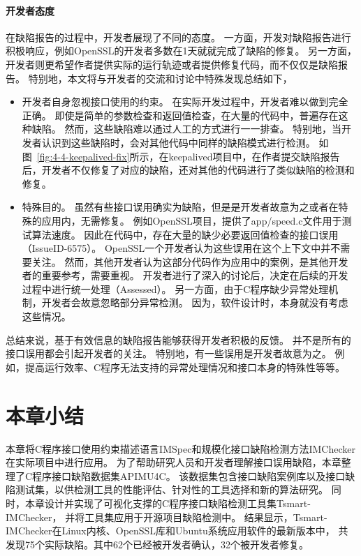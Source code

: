\paragraph{开发者态度}
在缺陷报告的过程中，开发者展现了不同的态度。
一方面，开发对缺陷报告进行积极响应，例如OpenSSL的开发者多数在1天就就完成了缺陷的修复。
另一方面，开发者则更希望作者提供实际的运行轨迹或者提供修复代码，而不仅仅是缺陷报告。
特别地，本文将与开发者的交流和讨论中特殊发现总结如下，
\begin{itemize}
	\item 开发者自身忽视接口使用的约束。
	在实际开发过程中，开发者难以做到完全正确。
	即使是简单的参数检查和返回值检查，在大量的代码中，普遍存在这种缺陷。
	然而，这些缺陷难以通过人工的方式进行一一排查。
	特别地，当开发者认识到这些缺陷时，会对其他代码中同样的缺陷模式进行检测。
	如图~\ref{fig:4-4-keepalived-fix}所示，在keepalived项目中，在作者提交缺陷报告后，开发者不仅修复了对应的缺陷，还对其他的代码进行了类似缺陷的检测和修复。
	\item 特殊目的。
	虽然有些接口误用确实为缺陷，但是是开发者故意为之或者在特殊的应用内，无需修复。
	例如OpenSSL项目，提供了app/speed.c文件用于测试算法速度。
	因此在代码中，存在大量的缺少必要返回值检查的接口误用（IssueID-6575）。
	OpenSSL一个开发者认为这些误用在这个上下文中并不需要关注。
	然而，其他开发者认为这部分代码作为应用中的案例，是其他开发者的重要参考，需要重视。
	开发者进行了深入的讨论后，决定在后续的开发过程中进行统一处理（Assessed）。
	另一方面，由于C程序缺少异常处理机制，开发者会故意忽略部分异常检测。
	因为，软件设计时，本身就没有考虑这些情况。
\end{itemize}

总结来说，基于有效信息的缺陷报告能够获得开发者积极的反馈。
并不是所有的接口误用都会引起开发者的关注。
特别地，有一些误用是开发者故意为之。
例如，提高运行效率、C程序无法支持的异常处理情况和接口本身的特殊性等等。





\section{本章小结}
\label{sec:4.5}
本章将C程序接口使用约束描述语言IMSpec和规模化接口缺陷检测方法IMChecker在实际项目中进行应用。
为了帮助研究人员和开发者理解接口误用缺陷，本章整理了C程序接口缺陷数据集APIMU4C。
该数据集包含接口缺陷案例库以及接口缺陷测试集，以供检测工具的性能评估、针对性的工具选择和新的算法研究。
同时，本章设计并实现了可视化支撑的C程序接口缺陷检测工具集Tsmart-IMChecker，
并将工具集应用于开源项目缺陷检测中。
结果显示，Tsmart-IMChecker在Linux内核、OpenSSL库和Ubuntu系统应用软件的最新版本中，
共发现75个实际缺陷。其中62个已经被开发者确认，32个被开发者修复。